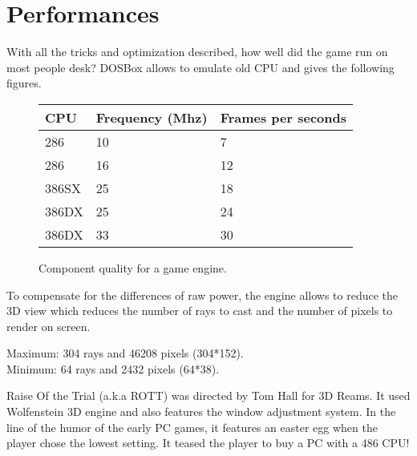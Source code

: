 \section{Performances}
With all the tricks and optimization described, how well did the game run on most people desk? DOSBox allows to emulate old CPU and gives the following figures.

\begin{figure}[H]
\centering
\begin{tabularx}{\textwidth}{ X X X }
  \toprule
  \textbf{CPU} & \textbf{Frequency (Mhz)} & \textbf{Frames per seconds} \\ \bottomrule
  286 & 10 & 7 \\
286 & 16 & 12 \\
386SX & 25 &  18 \\
386DX & 25 & 24 \\
386DX & 33 & 30 \\ \bottomrule
\end{tabularx}
\caption{Component quality for a game engine.}
\end{figure}

To compensate for the differences of raw power, the engine allows to reduce the 3D view which reduces the number of rays to cast and the number of pixels to render on screen.
\par
Maximum: 304 rays and 46208 pixels (304*152).\\
Minimum:  64 rays and  2432 pixels (64*38).\\

  \begin{figure}[H]
\centering
 \end{figure}
 \par

   \begin{figure}[H]
\centering
 \end{figure}
 \par

   \begin{figure}[H]
\centering
 \end{figure}
 \par

Raise Of the Trial (a.k.a ROTT) was directed by Tom Hall for 3D Reams. It used Wolfenstein 3D engine and also features the window adjustment system. In the line of the humor of the early PC games, it features an easter egg when the player chose the lowest setting. It teased the player to buy a PC with a 486 CPU!
    \begin{figure}[H]
\centering
 \end{figure}
 \par